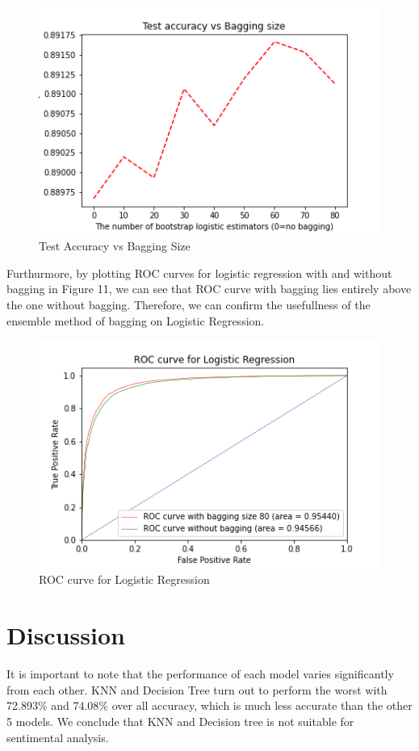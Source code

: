 \documentclass[10pt,twocolumn,letterpaper]{article}
\begin{document}
	\begin{figure}[H]
		\includegraphics[width=\columnwidth]{Logistic_bagging}
		\caption{Test Accuracy vs Bagging Size}\label{Logistic_bagging}
	\end{figure} 	
	Furthurmore, by plotting ROC curves for logistic regression with and without bagging in Figure 11, we can see that ROC curve with bagging lies entirely above the one without bagging. Therefore, we can confirm the usefullness of the ensemble method of bagging on Logistic Regression.
	
	\begin{figure}[htbp]
		\includegraphics[width=\columnwidth]{ROCComparsion}
		\caption{ROC curve for Logistic Regression}\label{ROCComparsion}
	\end{figure} 	
	\section{Discussion}
	It is important to note that the performance of each model varies significantly from each other. KNN and Decision Tree turn out to perform the worst with 72.893\% and 74.08\% over all accuracy, which is much less accurate than the other 5 models. We conclude that KNN and Decision tree is not suitable for sentimental analysis. 
	
\end{document}
